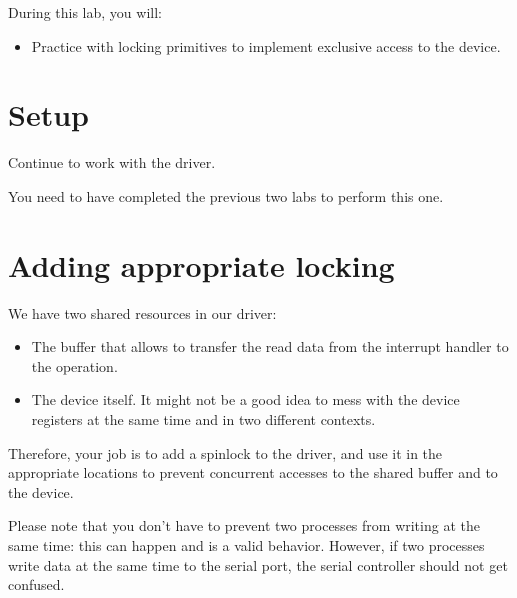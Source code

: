 
During this lab, you will:

\begin{itemize}
\item Practice with locking primitives to implement exclusive access
  to the device.
\end{itemize}

\section{Setup}

Continue to work with the  driver.

You need to have completed the previous two labs to perform this one.

\section{Adding appropriate locking}

We have two shared resources in our driver:
\begin{itemize}

\item The buffer that allows to transfer the read data from the
  interrupt handler to the  operation.

\item The device itself. It might not be a good idea to mess with the
  device registers at the same time and in two different contexts.

\end{itemize}

Therefore, your job is to add a spinlock to the driver, and use it in
the appropriate locations to prevent concurrent accesses to the shared
buffer and to the device.

Please note that you don't have to prevent two processes from writing
at the same time: this can happen and is a valid behavior. However, if
two processes write data at the same time to the serial port, the
serial controller should not get confused.
